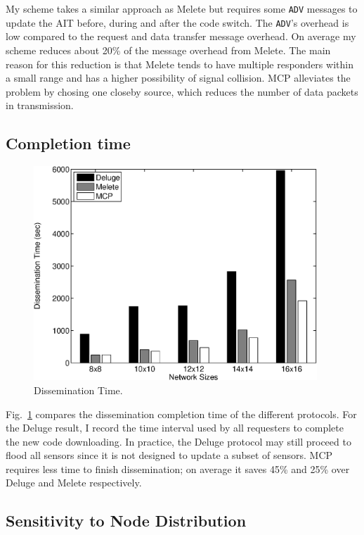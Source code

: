 My scheme takes a similar approach as Melete but requires some {\tt ADV} messages to update the AIT before, during and after the code switch. The {\tt ADV}'s overhead is low compared to the request and data transfer message overhead. On average my scheme reduces about 20\% of the message overhead from Melete. The main reason for this reduction is that Melete tends to have multiple responders within a small range and has a higher possibility of signal collision. MCP alleviates the problem by chosing one closeby source, which reduces the number of data packets in transmission.

\subsection{Completion time}

\begin{figure}[htbp]
\centering
\includegraphics[width=4.2in]{figures/ftime.eps}
\caption{Dissemination Time.}
\label{ftime}
\end{figure}

Fig.~\ref{ftime} compares the dissemination completion time of the different protocols. For the Deluge result, I record the time interval used by all requesters to complete the new code downloading. In practice, the Deluge protocol may still proceed to flood all sensors since it is not designed to update a subset of sensors. MCP requires less time to finish dissemination; on average it saves 45\% and 25\% over Deluge and Melete respectively.

\subsection{Sensitivity to Node Distribution}

